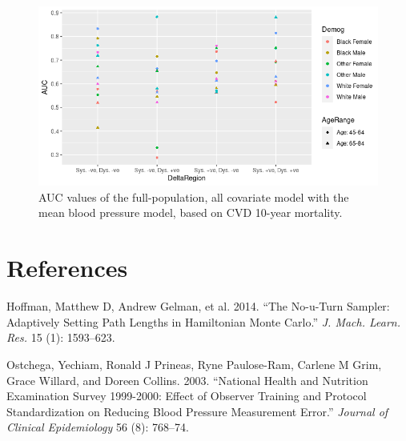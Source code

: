 \documentclass[
]{article}
\newlength{\cslhangindent}
\newlength{\cslentryspacingunit} %
\newenvironment{CSLReferences}[2] %
 {%
  \setlength{\parindent}{0pt}
  \ifodd #1
  \let\oldpar\par
  \def\par{\hangindent=\cslhangindent\oldpar}
  \fi
  \setlength{\parskip}{#2\cslentryspacingunit}
 }%
 {}
\begin{document}
\begin{figure}
\hypertarget{fig:DeltaAUCs}{%
\centering
\includegraphics{./Rmarkdown_Plots/DeltaDirection_AUCs.png}
\caption{AUC values of the full-population, all covariate model with the mean blood pressure model, based on CVD 10-year mortality.}\label{fig:DeltaAUCs}
}
\end{figure}

\hypertarget{references}{%
\section*{References}\label{references}}

\hypertarget{refs}{}
\begin{CSLReferences}{1}{0}
\leavevmode{}%
Hoffman, Matthew D, Andrew Gelman, et al. 2014. {``The No-u-Turn Sampler: Adaptively Setting Path Lengths in Hamiltonian Monte Carlo.''} \emph{J. Mach. Learn. Res.} 15 (1): 1593--623.

\leavevmode{}%
Ostchega, Yechiam, Ronald J Prineas, Ryne Paulose-Ram, Carlene M Grim, Grace Willard, and Doreen Collins. 2003. {``National Health and Nutrition Examination Survey 1999-2000: Effect of Observer Training and Protocol Standardization on Reducing Blood Pressure Measurement Error.''} \emph{Journal of Clinical Epidemiology} 56 (8): 768--74.

\end{CSLReferences}
\end{document}
